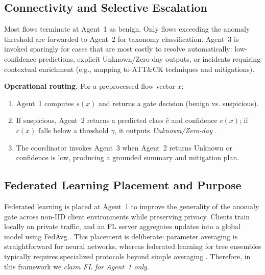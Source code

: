 \subsection{Connectivity and Selective Escalation}
Most flows terminate at Agent~1 as benign. Only flows exceeding the anomaly threshold are forwarded to Agent~2 for taxonomy classification. Agent~3 is invoked sparingly for cases that are most costly to resolve automatically: low-confidence predictions, explicit Unknown/Zero-day outputs, or incidents requiring contextual enrichment (e.g., mapping to ATT\&CK techniques and mitigations).

\textbf{Operational routing.} For a preprocessed flow vector $x$:
\begin{enumerate}
  \item Agent~1 computes $s(x)$ and returns a gate decision (benign vs. suspicious).
  \item If suspicious, Agent~2 returns a predicted class $\hat{c}$ and confidence $c(x)$; if $c(x)$ falls below a threshold $\gamma$, it outputs \emph{Unknown/Zero-day} \cite{scheirer2013openset}.
  \item The coordinator invokes Agent~3 when Agent~2 returns Unknown or confidence is low, producing a grounded summary and mitigation plan.
\end{enumerate}

\subsection{Federated Learning Placement and Purpose}
Federated learning is placed at Agent~1 to improve the generality of the anomaly gate across non-IID client environments while preserving privacy. Clients train locally on private traffic, and an FL server aggregates updates into a global model using FedAvg \cite{mcmahan2017fedavg}. This placement is deliberate: parameter averaging is straightforward for neural networks, whereas federated learning for tree ensembles typically requires specialized protocols beyond simple averaging \cite{kairouz2021flsurvey}. Therefore, in this framework we \emph{claim FL for Agent~1 only}.

